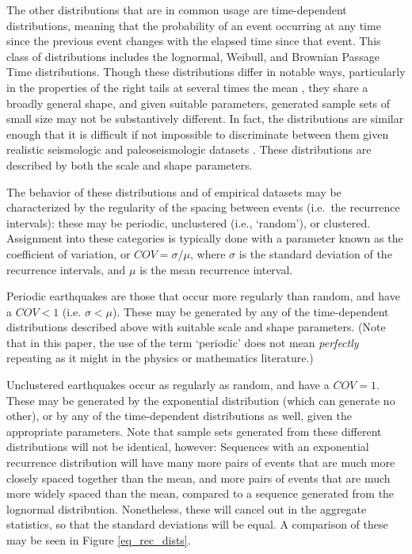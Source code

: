 \documentclass[se, manuscript]{copernicus}
\begin{document}
The other distributions that are in common usage are time-dependent
distributions, meaning that the probability of an event occurring at any
time since the previous event changes with the elapsed time since that
event. This class of distributions includes the lognormal, Weibull, and
Brownian Passage Time \citep{matthews_brownian_2002} distributions.
Though these distributions differ in notable ways, particularly in the
properties of the right tails at several times the mean
\citep{davis_longer_1989,matthews_brownian_2002}, they share a broadly
general shape, and given suitable parameters, generated sample sets of
small size may not be substantively different. In fact, the
distributions are similar enough that it is difficult if not impossible
to discriminate between them given realistic seismologic and
paleoseismologic datasets
\citep{matthews_brownian_2002,ogata_estimating_1999}. These
distributions are described by both the scale and shape parameters.

The behavior of these distributions and of empirical datasets may be
characterized by the regularity of the spacing between events (i.e.~the
recurrence intervals): these may be periodic, unclustered (i.e.,
`random'), or clustered. Assignment into these categories is typically
done with a parameter known as the coefficient of variation, or
\(COV = \sigma / \mu\), where \(\sigma\) is the standard deviation of
the recurrence intervals, and \(\mu\) is the mean recurrence interval.

Periodic earthquakes are those that occur more regularly than random,
and have a \(COV < 1\) (i.e. \(\sigma < \mu\)). These may be generated
by any of the time-dependent distributions described above with suitable
scale and shape parameters. (Note that in this paper, the use of the
term `periodic' does not mean \emph{perfectly} repeating as it might in
the physics or mathematics literature.)

Unclustered earthquakes occur as regularly as random, and have a
\(COV=1\). These may be generated by the exponential distribution (which
can generate no other), or by any of the time-dependent distributions as
well, given the appropriate parameters. Note that sample sets generated
from these different distributions will not be identical, however:
Sequences with an exponential recurrence distribution will have many
more pairs of events that are much more closely spaced together than the
mean, and more pairs of events that are much more widely spaced than the
mean, compared to a sequence generated from the lognormal distribution.
Nonetheless, these will cancel out in the aggregate statistics, so that
the standard deviations will be equal. A comparison of these may be seen
in Figure \ref{eq_rec_dists}.
\end{document}
